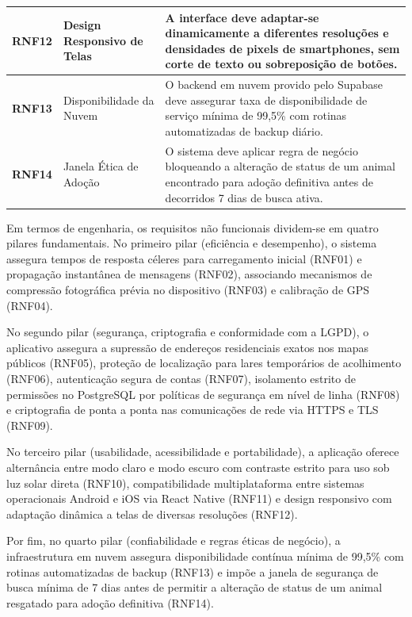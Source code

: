 {\begin{longtable}{|>{\centering\arraybackslash}p{1.4cm}|>{\raggedright\arraybackslash}p{3.8cm}|>{\raggedright\arraybackslash}p{9.2cm}|}
\textbf{RNF12} & Design Responsivo de Telas & A interface deve adaptar-se dinamicamente a diferentes resoluções e densidades de pixels de smartphones, sem corte de texto ou sobreposição de botões. \\ \hline
\textbf{RNF13} & Disponibilidade da Nuvem & O backend em nuvem provido pelo Supabase deve assegurar taxa de disponibilidade de serviço mínima de 99,5\% com rotinas automatizadas de backup diário. \\ \hline
\textbf{RNF14} & Janela Ética de Adoção & O sistema deve aplicar regra de negócio bloqueando a alteração de status de um animal encontrado para adoção definitiva antes de decorridos 7 dias de busca ativa. \\ \hline
\end{longtable}
}

Em termos de engenharia, os requisitos não funcionais dividem-se em quatro pilares fundamentais. No primeiro pilar (eficiência e desempenho), o sistema assegura tempos de resposta céleres para carregamento inicial (RNF01) e propagação instantânea de mensagens (RNF02), associando mecanismos de compressão fotográfica prévia no dispositivo (RNF03) e calibração de GPS (RNF04).

No segundo pilar (segurança, criptografia e conformidade com a LGPD), o aplicativo assegura a supressão de endereços residenciais exatos nos mapas públicos (RNF05), proteção de localização para lares temporários de acolhimento (RNF06), autenticação segura de contas (RNF07), isolamento estrito de permissões no PostgreSQL por políticas de segurança em nível de linha (RNF08) e criptografia de ponta a ponta nas comunicações de rede via HTTPS e TLS (RNF09).

No terceiro pilar (usabilidade, acessibilidade e portabilidade), a aplicação oferece alternância entre modo claro e modo escuro com contraste estrito para uso sob luz solar direta (RNF10), compatibilidade multiplataforma entre sistemas operacionais Android e iOS via React Native (RNF11) e design responsivo com adaptação dinâmica a telas de diversas resoluções (RNF12).

Por fim, no quarto pilar (confiabilidade e regras éticas de negócio), a infraestrutura em nuvem assegura disponibilidade contínua mínima de 99,5\% com rotinas automatizadas de backup (RNF13) e impõe a janela de segurança de busca mínima de 7 dias antes de permitir a alteração de status de um animal resgatado para adoção definitiva (RNF14).

\clearpage

